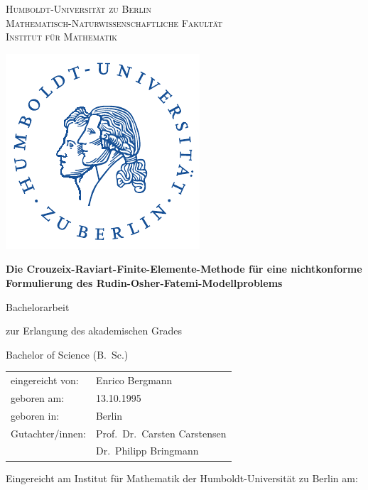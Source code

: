 \begin{titlepage}
  \begin{minipage}{.65\textwidth}
  {\scshape{\Large Humboldt-Universität zu Berlin}\\
  Mathematisch-Naturwissenschaftliche Fakultät\\
  Institut für Mathematik\par}
  \end{minipage}
  \begin{minipage}{.25\textwidth}
    \begin{flushright}
      \includegraphics*[scale=.6]{pictures/logos/husiegel_bw.pdf}
    \end{flushright}
  \end{minipage}

  \centering

  \vspace{3cm}

  {\huge\bfseries Die Crouzeix\--Raviart\--Finite\--Elemente\--Methode für eine
  nichtkonforme Formulierung des Rudin\--Osher\--Fatemi\--Modellproblems\par}

  \vspace{2cm}

  {\huge Bachelorarbeit}

  \vspace{1.5cm}

  {\LARGE zur Erlangung des akademischen Grades}

  \vspace{0.3cm}

  {\LARGE Bachelor of Science (B.\ Sc.)}

  \vspace{3cm}

  \flushleft
  {\LARGE
  \begin{tabular}{ll}
  eingereicht von: &Enrico Bergmann\\
  geboren am: &13.10.1995\\
  geboren in: &Berlin\\
    Gutachter/innen: &Prof.\ Dr.\ Carsten Carstensen\\
    &Dr.\ Philipp Bringmann
  \end{tabular}
  }
  \vfill

  {\small Eingereicht am Institut für Mathematik der Humboldt-Universität zu
  Berlin am: }
\end{titlepage}
